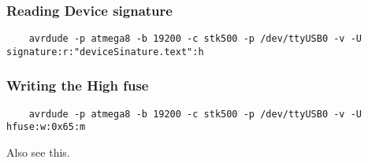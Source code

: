 \documentclass{article}
\begin{document}
\subsubsection*{Reading Device signature}
\begin{verbatim}
    avrdude -p atmega8 -b 19200 -c stk500 -p /dev/ttyUSB0 -v -U signature:r:"deviceSinature.text":h
\end{verbatim}


\subsubsection*{Writing the High fuse}
\begin{verbatim}
    avrdude -p atmega8 -b 19200 -c stk500 -p /dev/ttyUSB0 -v -U hfuse:w:0x65:m
\end{verbatim}

Also see this\cite{alsosee}.



\end{document}
